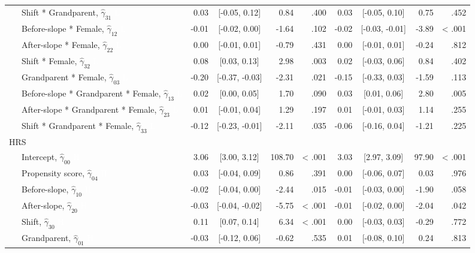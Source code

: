\documentclass[
  english,
  man, noextraspace]{apa7}
\newenvironment{lltable}{\begin{landscape}\begin{center}\begin{ThreePartTable}}{\end{ThreePartTable}\end{center}\end{landscape}}
\begin{document}
\begin{appendix}
\begin{lltable}
{\begin{longtable}{lrcrrrcrr}
\ \ \ Shift * Grandparent, $\hat{\gamma}_{31}$ \textcolor{white}{L} & 0.03 & [-0.05, 0.12] & 0.84 & .400 & 0.03 & [-0.05, 0.10] & 0.75 & .452\\
\ \ \ Before-slope * Female, $\hat{\gamma}_{12}$ \textcolor{white}{L} & -0.01 & [-0.02, 0.00] & -1.64 & .102 & -0.02 & [-0.03, -0.01] & -3.89 & < .001\\
\ \ \ After-slope * Female, $\hat{\gamma}_{22}$ \textcolor{white}{L} & 0.00 & [-0.01, 0.01] & -0.79 & .431 & 0.00 & [-0.01, 0.01] & -0.24 & .812\\
\ \ \ Shift * Female, $\hat{\gamma}_{32}$ \textcolor{white}{L} & 0.08 & [0.03, 0.13] & 2.98 & .003 & 0.02 & [-0.03, 0.06] & 0.84 & .402\\
\ \ \ Grandparent * Female, $\hat{\gamma}_{03}$ \textcolor{white}{L} & -0.20 & [-0.37, -0.03] & -2.31 & .021 & -0.15 & [-0.33, 0.03] & -1.59 & .113\\
\ \ \ Before-slope * Grandparent * Female, $\hat{\gamma}_{13}$ \textcolor{white}{L} & 0.02 & [0.00, 0.05] & 1.70 & .090 & 0.03 & [0.01, 0.06] & 2.80 & .005\\
\ \ \ After-slope * Grandparent * Female, $\hat{\gamma}_{23}$ \textcolor{white}{L} & 0.01 & [-0.01, 0.04] & 1.29 & .197 & 0.01 & [-0.01, 0.03] & 1.14 & .255\\
\ \ \ Shift * Grandparent * Female, $\hat{\gamma}_{33}$ \textcolor{white}{L} & -0.12 & [-0.23, -0.01] & -2.11 & .035 & -0.06 & [-0.16, 0.04] & -1.21 & .225\\
HRS &  &  &  &  &  &  &  & \\
\ \ \ Intercept, $\hat{\gamma}_{00}$ \textcolor{white}{H} & 3.06 & [3.00, 3.12] & 108.70 & < .001 & 3.03 & [2.97, 3.09] & 97.90 & < .001\\
\ \ \ Propensity score, $\hat{\gamma}_{04}$ \textcolor{white}{H} & 0.03 & [-0.04, 0.09] & 0.86 & .391 & 0.00 & [-0.06, 0.07] & 0.03 & .976\\
\ \ \ Before-slope, $\hat{\gamma}_{10}$ \textcolor{white}{H} & -0.02 & [-0.04, 0.00] & -2.44 & .015 & -0.01 & [-0.03, 0.00] & -1.90 & .058\\
\ \ \ After-slope, $\hat{\gamma}_{20}$ \textcolor{white}{H} & -0.03 & [-0.04, -0.02] & -5.75 & < .001 & -0.01 & [-0.02, 0.00] & -2.04 & .042\\
\ \ \ Shift, $\hat{\gamma}_{30}$ \textcolor{white}{H} & 0.11 & [0.07, 0.14] & 6.34 & < .001 & 0.00 & [-0.03, 0.03] & -0.29 & .772\\
\ \ \ Grandparent, $\hat{\gamma}_{01}$ \textcolor{white}{H} & -0.03 & [-0.12, 0.06] & -0.62 & .535 & 0.01 & [-0.08, 0.10] & 0.24 & .813\\

\end{longtable}}
\end{lltable}
\end{appendix}
\end{document}
